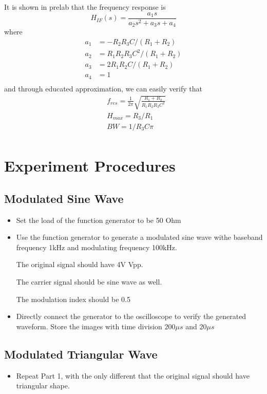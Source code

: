 \documentclass[a4paper]{article}
\begin{document}
    It is shown in prelab that the frequency response is 
    \begin{equation*}
        H_{IF}(s) = \frac{a_1s}{a_2s^2+a_3s+a_4}
    \end{equation*}
    where
    \begin{align*}
        a_1 & = -R_2R_3C/(R_1+R_2) \\
        a_2 & = R_1R_2R_3C^2/(R_1+R_2) \\
        a_3 & = 2R_1R_2C/(R_1+R_2) \\
        a_4 & = 1 \\ 
    \end{align*}
    and through educated approximation, we can easily verify that 
    \begin{align*}
        & f_{res} = \frac{1}{2\pi} \sqrt{\frac{R_1+R_2}{R_1R_2R_3C^2}} \\
        & H_{max} = R_3/R_1 \\
        & BW  = 1/R_3C\pi \\
    \end{align*}

    \section{Experiment Procedures}
    \subsection{Modulated Sine Wave}
    \begin{itemize}
        \item Set the load of the function generator to be 50 Ohm
        \item Use the function generator to generate a modulated sine wave withe baseband frequency 1kHz and modulating frequency 100kHz.
        
        The original signal should have 4V Vpp.

        The carrier signal should be sine wave as well.

        The modulation index should be 0.5
        \item Directly connect the generator to the oscilloscope to verify the generated waveform. Store the images with time division $200\mu s$ and $20\mu s$
    \end{itemize}

    \subsection{Modulated Triangular Wave}
    \begin{itemize}
        \item Repeat Part 1, with the only different that the original signal should have triangular shape.
    \end{itemize}
\end{document}
